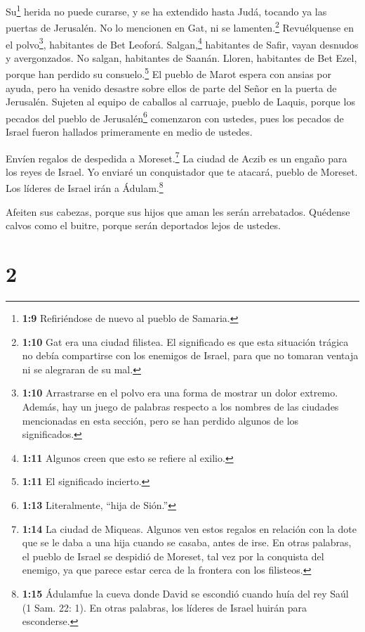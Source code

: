  Su\footnote{\textbf{1:9} Refiriéndose de nuevo al pueblo de
  Samaria.} herida no puede curarse, y se ha extendido hasta Judá,
tocando ya las puertas de Jerusalén.  No lo mencionen en
Gat, ni se lamenten.\footnote{\textbf{1:10} Gat era una ciudad filistea.
  El significado es que esta situación trágica no debía compartirse con
  los enemigos de Israel, para que no tomaran ventaja ni se alegraran de
  su mal.} Revuélquense en el polvo\footnote{\textbf{1:10} Arrastrarse
  en el polvo era una forma de mostrar un dolor extremo. Además, hay un
  juego de palabras respecto a los nombres de las ciudades mencionadas
  en esta sección, pero se han perdido algunos de los significados.},
habitantes de Bet Leoforá.  Salgan,\footnote{\textbf{1:11}
  Algunos creen que esto se refiere al exilio.} habitantes de Safir,
vayan desnudos y avergonzados. No salgan, habitantes de Saanán. Lloren,
habitantes de Bet Ezel, porque han perdido su consuelo.\footnote{\textbf{1:11}
  El significado incierto.}  El pueblo de Marot espera con
ansias por ayuda, pero ha venido desastre sobre ellos de parte del Señor
en la puerta de Jerusalén.  Sujeten al equipo de caballos
al carruaje, pueblo de Laquis, porque los pecados del pueblo de
Jerusalén\footnote{\textbf{1:13} Literalmente, ``hija de Sión.''}
comenzaron con ustedes, pues los pecados de Israel fueron hallados
primeramente en medio de ustedes.

 Envíen regalos de despedida a Moreset.\footnote{\textbf{1:14}
  La ciudad de Miqueas. Algunos ven estos regalos en relación con la
  dote que se le daba a una hija cuando se casaba, antes de irse. En
  otras palabras, el pueblo de Israel se despidió de Moreset, tal vez
  por la conquista del enemigo, ya que parece estar cerca de la frontera
  con los filisteos.} La ciudad de Aczib es un engaño para los reyes de
Israel.  Yo enviaré un conquistador que te atacará, pueblo
de Moreset. Los líderes de Israel irán a Ádulam.\footnote{\textbf{1:15}
  Ádulamfue la cueva donde David se escondió cuando huía del rey Saúl (1
  Sam. 22: 1). En otras palabras, los líderes de Israel huirán para
  esconderse.}

 Afeiten sus cabezas, porque sus hijos que aman les serán
arrebatados. Quédense calvos como el buitre, porque serán deportados
lejos de ustedes.

\hypertarget{section-1}{%
\section{2}\label{section-1}}

